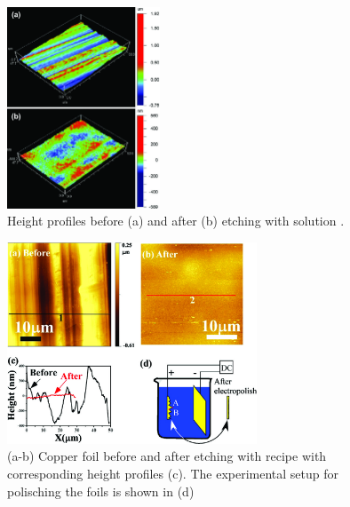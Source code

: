 
\begin{figure}[h]
 \begin{center}
  \includegraphics[height=6cm]{./images/0fcfd512d196815269000000-fig1.jpg}
 \end{center}
\caption{Height profiles before (a) and after (b) etching with solution \cite{bin_zhang_low-temperature_2012}.}
\end{figure}
\begin{figure}[h]
 \begin{center}
  \includegraphics[height=6cm]{./images/cm1028854-fig2.jpg}
 \end{center}
\caption{(a-b) Copper foil before and after etching with recipe \cite{luo_effect_2011} with corresponding height profiles (c). The experimental setup for polisching the foils is shown in (d)}
\label{figure:luo-effect_2011}
\end{figure}


